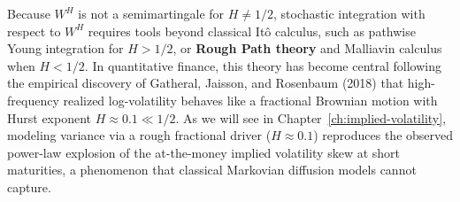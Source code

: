 Because $W^H$ is not a semimartingale for $H \neq 1/2$, stochastic integration with respect to $W^H$ requires tools beyond classical It\^o calculus, such as pathwise Young integration for $H > 1/2$, or \textbf{Rough Path theory} and Malliavin calculus when $H < 1/2$. In quantitative finance, this theory has become central following the empirical discovery of Gatheral, Jaisson, and Rosenbaum (2018) that high-frequency realized log-volatility behaves like a fractional Brownian motion with Hurst exponent $H \approx 0.1 \ll 1/2$. As we will see in Chapter~\ref{ch:implied-volatility}, modeling variance via a rough fractional driver ($H \approx 0.1$) reproduces the observed power-law explosion of the at-the-money implied volatility skew at short maturities, a phenomenon that classical Markovian diffusion models cannot capture.
